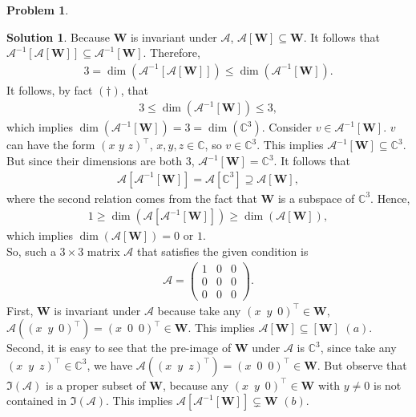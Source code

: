 \documentclass{book}
\theoremstyle{definition}
\newtheorem*{prob*}{Problem}
\newtheorem*{sln*}{Solution}
\newcommand{\W}{\mathbf{W}}
\begin{document}
\begin{prob*}
\begin{sln*}
		\noindent Because $\W$ is invariant under $\mathcal{A}$, $\mathcal{A}[\W] \subseteq \W$. It follows that $\mathcal{A}^{-1}\left[ \mathcal{A}[\W] \right] \subseteq \mathcal{A}^{-1}[\W]$. Therefore,
		\begin{align*}
		3 = \dim\left( \mathcal{A}^{-1}\left[ \mathcal{A}[\W] \right]  \right) \leq \dim\left( \mathcal{A}^{-1}[\W]  \right).
		\end{align*}
		It follows, by fact $(\dagger)$, that
		\begin{align*}
		3 \leq \dim\left( \mathcal{A}^{-1}[\W]  \right) \leq 3,
		\end{align*}
		which implies $\dim\left( \mathcal{A}^{-1}[\W]  \right) = 3 = \dim(\mathbb{C}^3)$. Consider $v\in \mathcal{A}^{-1}[\W] $. $v$ can have the form $(x\,\,y\,\,z)^\top$, $x,y,z\in \mathbb{C}$, so $v\in\mathbb{C}^3$. This implies $\mathcal{A}^{-1}[\W] \subseteq \mathbb{C}^3$. But since their dimensions are both 3, $\mathcal{A}^{-1}[\W] = \mathbb{C}^3$. It follows that
		\begin{align*}
		\mathcal{A}\left[ \mathcal{A}^{-1}[\W] \right] = \mathcal{A}[\mathbb{C}^3] \supseteq \mathcal{A}[\W],
		\end{align*}
		where the second relation comes from the fact that $\W$ is a subspace of $\mathbb{C}^3$. Hence,
		\begin{align*}
		1 \geq \dim\left( \mathcal{A}\left[ \mathcal{A}^{-1}[\W] \right] \right) \geq \dim\left( \mathcal{A}[\W] \right),
		\end{align*}
		which implies $\dim(\mathcal{A}[\W]) = 0$ or $1$.\\
		
		\noindent So, such a $3\times 3$ matrix $\mathcal{A}$ that satisfies the given condition is
		\begin{align*}
		\mathcal{A} = \begin{pmatrix}
		1&0&0\\
		0&0&0\\
		0&0&0
		\end{pmatrix}.
		\end{align*}
		First, $\W$ is invariant under $\mathcal{A}$ because take any $(x\,\,\,y\,\,\,0)^\top \in \W$, $\mathcal{A}\left((x\,\,\,y\,\,\,0)^\top\right) = (x\,\,\,0\,\,\,0)^\top \in \W$. This implies $\mathcal{A}[\W] \subseteq [\W]$ $(a)$. \\
		
		\noindent Second, it is easy to see that the pre-image of $\W$ under $\mathcal{A}$ is $\mathbb{C}^3$, since take any $(x\,\,\,y\,\,\,z)^\top \in \mathbb{C}^3$, we have $\mathcal{A}\left((x\,\,\,y\,\,\,z)^\top\right) = (x\,\,\,0\,\,\,0)^\top \in \W$. But observe that $\Im(\mathcal{A})$ is a proper subset of $\W$, because any $(x\,\,\,y\,\,\,0)^\top \in \W$ with $y\neq 0$ is not contained in $\Im(\mathcal{A})$. This implies $\mathcal{A}\left[\mathcal{A}^{-1}[\W]\right] \subsetneq \W$  $(b)$.\\ 
		

\end{sln*}
\end{prob*}
\end{document}
